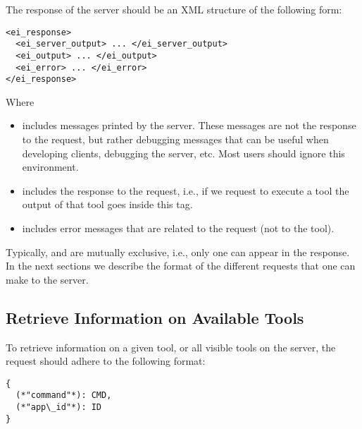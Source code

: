 \medskip
\noindent
The response of the server should be an XML structure of the following
form:

\bigskip
\begin{lstlisting}
<ei_response>
  <ei_server_output> ... </ei_server_output>
  <ei_output> ... </ei_output>
  <ei_error> ... </ei_error>
</ei_response>
\end{lstlisting}

\bigskip
\noindent
Where
%
\begin{itemize}
%
\item {} includes messages printed by the
  server. These messages are not the response to the request, but
  rather debugging messages that can be useful when developing
  clients, debugging the server, etc. Most users should ignore this
  environment.
%
\item {} includes the response to the request, i.e., if
  we request to execute a tool the output of that tool
  goes inside this tag.
%
\item {} includes error messages that are related to the
  request (not to the tool).
%
\end{itemize}
%
Typically,  and  are mutually exclusive,
i.e., only one can appear in the response.%
%
In the next sections we describe the format of the different requests
that one can make to the \ei server.

\subsection{Retrieve Information on Available Tools}
\label{sec:server:access:rettools}

To retrieve information on a given tool, or all visible tools on the
server, the request should adhere to the following format:

\bigskip
\begin{lstlisting}
{
  (*"command"*): CMD,
  (*"app\_id"*): ID
}
\end{lstlisting}

